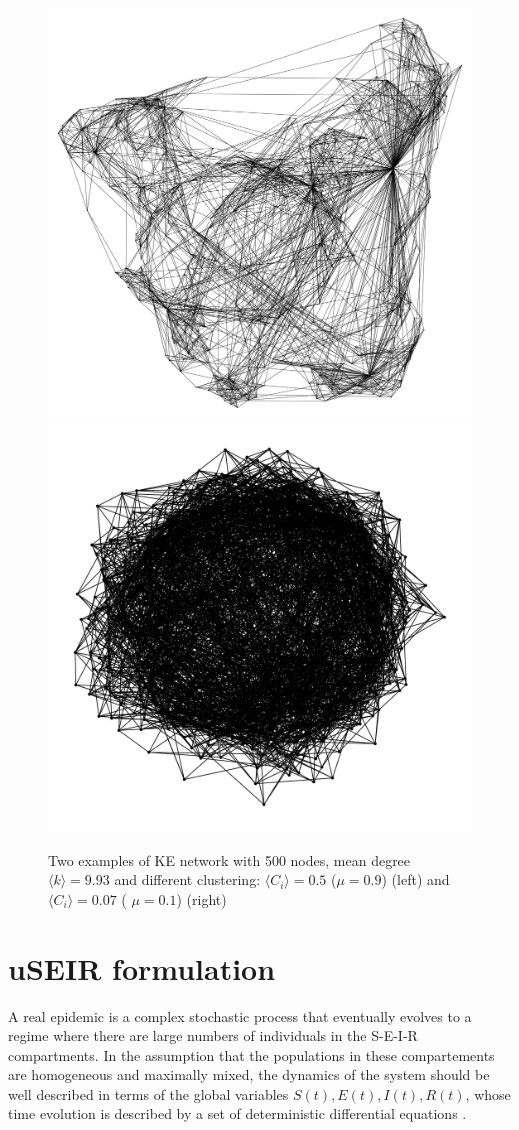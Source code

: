 \documentclass[a4paper,oneside,11pt]{article}
\begin{document}
\begin{figure}[htbp]
\centering
\includegraphics[width=.45\linewidth]{ke_05_09.pdf} \includegraphics[width=.45\linewidth]{ke_05_01.pdf}
\caption{Two examples of KE network with 500 nodes, mean degree \(\langle k \rangle=9.93\) and different clustering: \(\langle C_i \rangle = 0.5\) (\(\mu=0.9\)) (left) and \(\langle C_i \rangle = 0.07\) ( \(\mu=0.1\)) (right)}
\label{fig:networks}
\end{figure}

\section{uSEIR formulation}
\label{sec:useir}

A real epidemic is a complex stochastic process that eventually evolves to a regime where there are  large numbers of individuals in the S-E-I-R compartments. In the assumption that the populations in these compartements are homogeneous and maximally mixed, the dynamics of the system should be well described in terms of the global variables  $S(t), E(t), I(t), R(t)$, whose time evolution is described by a set of deterministic differential equations \cite{Kermack1927,anderson1992infectious}. 
\end{document}
